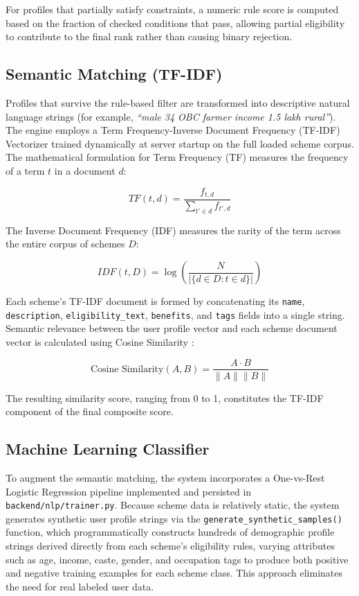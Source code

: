 \documentclass[10pt, journal, twocolumn]{IEEEtran}
\begin{document}
For profiles that partially satisfy constraints, a numeric rule score is computed based on the fraction of checked conditions that pass, allowing partial eligibility to contribute to the final rank rather than causing binary rejection.

\subsection{Semantic Matching (TF-IDF)}
Profiles that survive the rule-based filter are transformed into descriptive natural language strings (for example, \textit{``male 34 OBC farmer income 1.5 lakh rural''}). The engine employs a Term Frequency-Inverse Document Frequency (TF-IDF) Vectorizer \cite{salton1988} trained dynamically at server startup on the full loaded scheme corpus. The mathematical formulation for Term Frequency (TF) measures the frequency of a term $t$ in a document $d$:

\begin{equation}
    TF(t, d) = \frac{f_{t,d}}{\sum_{t' \in d} f_{t',d}}
\end{equation}

The Inverse Document Frequency (IDF) measures the rarity of the term across the entire corpus of schemes $D$:

\begin{equation}
    IDF(t, D) = \log \left( \frac{N}{|\{d \in D : t \in d\}|} \right)
\end{equation}

Each scheme's TF-IDF document is formed by concatenating its \texttt{name}, \texttt{description}, \texttt{eligibility\_text}, \texttt{benefits}, and \texttt{tags} fields into a single string. Semantic relevance between the user profile vector and each scheme document vector is calculated using Cosine Similarity \cite{manning2008}:

\begin{equation}
    \text{Cosine Similarity}(A, B) = \frac{A \cdot B}{\|A\| \|B\|}
\end{equation}

The resulting similarity score, ranging from 0 to 1, constitutes the TF-IDF component of the final composite score.

\subsection{Machine Learning Classifier}
To augment the semantic matching, the system incorporates a One-vs-Rest Logistic Regression pipeline \cite{cox1958, pedregosa2011} implemented and persisted in \texttt{backend/nlp/trainer.py}. Because scheme data is relatively static, the system generates synthetic user profile strings via the \texttt{generate\_synthetic\_samples()} function, which programmatically constructs hundreds of demographic profile strings derived directly from each scheme's eligibility rules, varying attributes such as age, income, caste, gender, and occupation tags to produce both positive and negative training examples for each scheme class. This approach eliminates the need for real labeled user data.
\end{document}
